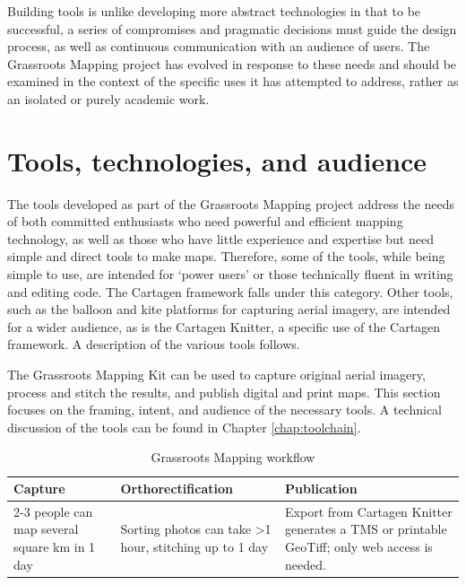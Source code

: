 \documentclass[11pt,oneside,notitlepage]{report}
\newcommand{\otoprule}{\midrule[\heavyrulewidth]}
\begin{document}
Building tools is unlike developing more abstract technologies in that to be successful, a series of compromises and pragmatic decisions must guide the design process, as well as continuous communication with an audience of users. The Grassroots Mapping project has evolved in response to these needs and should be examined in the context of the specific uses it has attempted to address, rather as an isolated or purely academic work.

\section{Tools, technologies, and audience}

The tools developed as part of the Grassroots Mapping project address the needs of both committed enthusiasts who need powerful and efficient mapping technology, as well as those who have little experience and expertise but need simple and direct tools to make maps. Therefore, some of the tools, while being simple to use, are intended for `power users' or those technically fluent in writing and editing code. The Cartagen framework falls under this category. Other tools, such as the balloon and kite platforms for capturing aerial imagery, are intended for a wider audience, as is the Cartagen Knitter, a specific use of the Cartagen framework. A description of the various tools follows.

The Grassroots Mapping Kit can be used to capture original aerial imagery, process and stitch the results, and publish digital and print maps. This section focuses on the framing, intent, and audience of the necessary tools. A technical discussion of the tools can be found in Chapter \ref{chap:toolchain}. 

\begin{table}[tp] 
\caption{Grassroots Mapping workflow}
\centering %
\renewcommand{\arraystretch}{1.4}
\begin{tabularx}{\textwidth}{YYY}
\toprule
Capture&Orthorectification&Publication\\\otoprule
2-3 people can map several square km in 1 day&Sorting photos can take \textgreater1 hour, stitching up to 1 day&Export from Cartagen Knitter generates a TMS or printable GeoTiff; only web access is needed.\\\bottomrule 
\end{tabularx}
\end{table}
\end{document}
